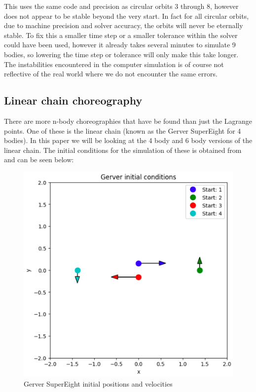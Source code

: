 \documentclass[11pt]{article}
\begin{document}
This uses the same code and precision as circular orbits 3 through 8, however does not appear to be stable beyond the very start. In fact for all circular orbits, due to machine precision and solver accuracy, the orbits will never be eternally stable. To fix this a smaller time step or a smaller tolerance within the solver could have been used, however it already takes several minutes to simulate 9 bodies, so lowering the time step or tolerance will only make this take longer. The instabilities encountered in the computer simulation is of course not reflective of the real world where we do not encounter the same errors.


\subsection{Linear chain choreography}

There are more n-body choreographies that have be found than just the Lagrange points. One of these is the linear chain (known as the Gerver SuperEight for 4 bodies). In this paper we will be looking at the 4 body and 6 body versions of the linear chain. The initial conditions for the simulation of these is obtained from \cite{NbodyLinearChain} and can be seen below:
\begin{figure}[!ht]
\centerline{\includegraphics[scale=0.3]{Pictures/Gerver_SuperEight_init.png}}
\caption{Gerver SuperEight initial positions and velocities}
\label{Gerver_SuperEight_init}
\end{figure}
\end{document}
